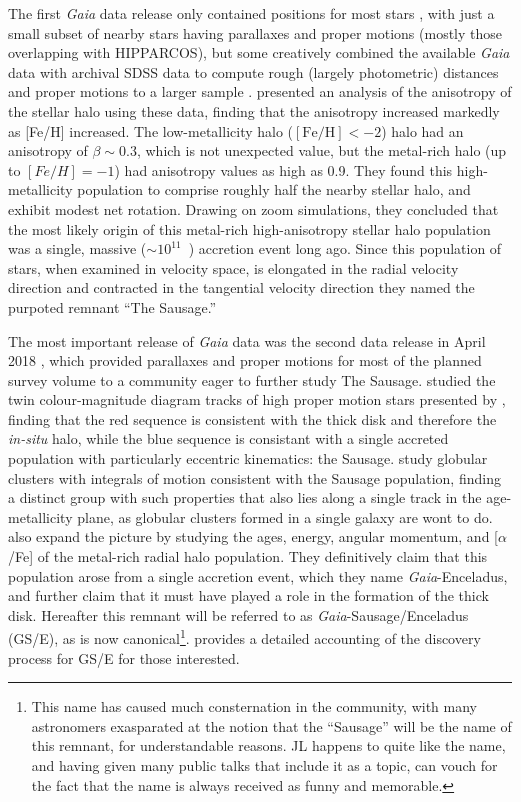 The first \textit{Gaia} data release only contained positions for most stars \parencite{gaiadr1}, with just a small subset of nearby stars having parallaxes and proper motions (mostly those overlapping with HIPPARCOS), but some creatively combined the available \textit{Gaia} data with archival SDSS data to compute rough (largely photometric) distances and proper motions to a larger sample \parencite{deason17,deboer18}. \textcite{belokurov18} presented an analysis of the anisotropy of the stellar halo using these data, finding that the anisotropy increased markedly as [Fe/H] increased. The low-metallicity halo ($\mathrm{[Fe/H]} < -2$) halo had an anisotropy of $\beta \sim 0.3$, which is not unexpected value, but the metal-rich halo (up to $[Fe/H]=-1$) had anisotropy values as high as 0.9. They found this high-metallicity population to comprise roughly half the nearby stellar halo, and exhibit modest net rotation. Drawing on zoom simulations, they concluded that the most likely origin of this metal-rich high-anisotropy stellar halo population was a single, massive ($\sim 10^{11}$~\Msun) accretion event long ago. Since this population of stars, when examined in velocity space, is elongated in the radial velocity direction and contracted in the tangential velocity direction they named the purpoted remnant ``The Sausage.''

The most important release of \textit{Gaia} data was the second data release in April 2018 \parencite{gaiadr2}, which provided parallaxes and proper motions for most of the planned survey volume to a community eager to further study The Sausage. \textcite{haywood18} studied the twin colour-magnitude diagram tracks of high proper motion stars presented by \textcite{gaiadr2_hrdiagram}, finding that the red sequence is consistent with the thick disk and therefore the \textit{in-situ} halo, while the blue sequence is consistant with a single accreted population with particularly eccentric kinematics: the Sausage. \textcite{myeong18} study globular clusters with integrals of motion consistent with the Sausage population, finding a distinct group with such properties that also lies along a single track in the age-metallicity plane, as globular clusters formed in a single galaxy are wont to do. \textcite{helmi18} also expand the picture by studying the ages, energy, angular momentum, and [$\alpha$/Fe] of the metal-rich radial halo population. They definitively claim that this population arose from a single accretion event, which they name \textit{Gaia}-Enceladus, and further claim that it must have played a role in the formation of the thick disk. Hereafter this remnant will be referred to as \textit{Gaia}-Sausage/Enceladus (GS/E), as is now canonical\footnote{This name has caused much consternation in the community, with many astronomers exasparated at the notion that the ``Sausage'' will be the name of this remnant, for understandable reasons. JL happens to quite like the name, and having given many public talks that include it as a topic, can vouch for the fact that the name is always received as funny and memorable.}. \textcite{deason24} provides a detailed accounting of the discovery process for GS/E for those interested.

